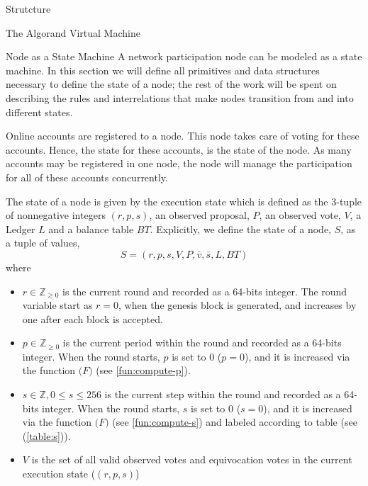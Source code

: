 \documentclass[10pt,a4paper]{article}
\begin{document}
\begin{section}{Strutcture}
\begin{subsection}{The Algorand Virtual Machine}
\end{subsection}
\begin{subsection}{Node as a State Machine}
A network participation node can be modeled as a state machine.
In this section we will define all primitives and data structures necessary to define the state
of a node; the rest of the work will be spent on describing the rules and interrelations that
make nodes transition from and into different states.

Online accounts are registered to a node. This node takes care of voting for these accounts.
Hence, the state for these accounts, is the state of the node. As many accounts may be 
registered in one node, the node will manage the participation for all of these accounts 
concurrently.

The {\sf state of a node} 
is given by the {\sf execution state} which is defined as the 3-tuple of nonnegative integers $(r, p, s)$, 
an observed proposal, $P$, 
an observed vote, $V$, 
a Ledger $L$ and 
a balance table $BT$.
Explicitly, we define the state of a node, $S$, as a tuple of values, 
$$
S = (r, p, s, V, P, \bar{v}, \bar{s}, L, BT)
$$ 
where
\begin{itemize}
    \item 
    $r\in\mathbb{Z}_{\ge 0}$ is the current round and recorded as a 64-bits integer. 
    The round variable start as $r=0$, when the genesis block is generated, and increases
    by one after each block is accepted.
    
    \item 
    $p\in\mathbb{Z}_{\ge 0}$ is the current period within the round and recorded as 
    a 64-bits integer. When the round starts, $p$ is set to 0 ($p=0$), and it is 
    increased via the function $\mathcal(F)$ (see \ref{fun:compute-p}).
    
    \item 
    $s\in\mathbb{Z}, 0\le s\le 256$ is the current {\sf step} within the round
    and recorded as a 64-bits integer. When the round starts, $s$ is set to 0 ($s=0$), 
    and it is increased via the function $\mathcal(F)$ (see \ref{fun:compute-s}) and 
    labeled according to table (see (\ref{table:s})).
    
    \item
    $V$ is the set of all {\sf valid observed votes} and 
    {\sf equivocation votes} in the current execution state
    ($(r,p,s)$)
    

\end{itemize}
\end{subsection}
\end{section}
\end{document}
